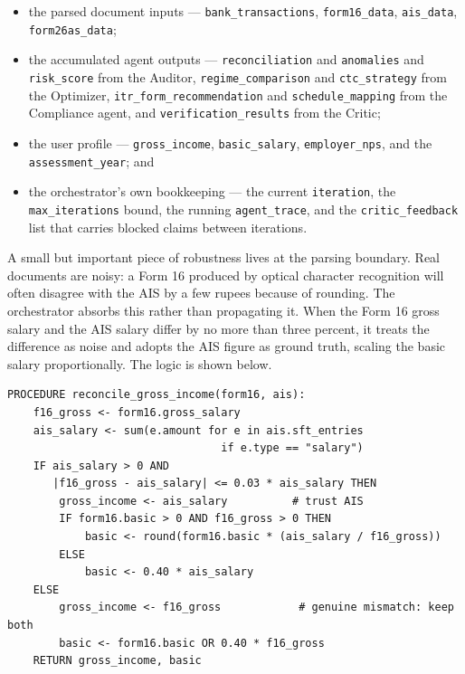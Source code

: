 \begin{itemize}
    \item the parsed document inputs --- \texttt{bank\_transactions},
          \texttt{form16\_data}, \texttt{ais\_data}, \texttt{form26as\_data};
    \item the accumulated agent outputs --- \texttt{reconciliation} and
          \texttt{anomalies} and \texttt{risk\_score} from the Auditor,
          \texttt{regime\_comparison} and \texttt{ctc\_strategy} from the
          Optimizer, \texttt{itr\_form\_recommendation} and
          \texttt{schedule\_mapping} from the Compliance agent, and
          \texttt{verification\_results} from the Critic;
    \item the user profile --- \texttt{gross\_income}, \texttt{basic\_salary},
          \texttt{employer\_nps}, and the \texttt{assessment\_year}; and
    \item the orchestrator's own bookkeeping --- the current \texttt{iteration},
          the \texttt{max\_iterations} bound, the running \texttt{agent\_trace},
          and the \texttt{critic\_feedback} list that carries blocked claims
          between iterations.
\end{itemize}

A small but important piece of robustness lives at the parsing boundary. Real
documents are noisy: a Form 16 produced by optical character recognition will
often disagree with the AIS by a few rupees because of rounding. The
orchestrator absorbs this rather than propagating it. When the Form 16 gross
salary and the AIS salary differ by no more than three percent, it treats the
difference as noise and adopts the AIS figure as ground truth, scaling the basic
salary proportionally. The logic is shown below.

\begin{lstlisting}[style=pseudo]
PROCEDURE reconcile_gross_income(form16, ais):
    f16_gross <- form16.gross_salary
    ais_salary <- sum(e.amount for e in ais.sft_entries
                                 if e.type == "salary")
    IF ais_salary > 0 AND
       |f16_gross - ais_salary| <= 0.03 * ais_salary THEN
        gross_income <- ais_salary          # trust AIS
        IF form16.basic > 0 AND f16_gross > 0 THEN
            basic <- round(form16.basic * (ais_salary / f16_gross))
        ELSE
            basic <- 0.40 * ais_salary
    ELSE
        gross_income <- f16_gross            # genuine mismatch: keep both
        basic <- form16.basic OR 0.40 * f16_gross
    RETURN gross_income, basic
\end{lstlisting}


